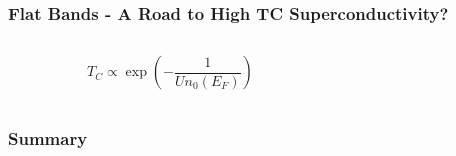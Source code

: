 \documentclass[aspectratio=169]{beamer}
\title{}
\author{Tjark Sievers}
\date{}
\institute[I. ITP - Nonequilibrium Quantum Dynamics]{I. Institute of Theoretical Physics}
\begin{document}
{
\begin{frame}
	\titlepage
\end{frame}
}
\addtocounter{framenumber}{-1}

\begin{frame}
	\frametitle{Flat Bands - A Road to High TC Superconductivity?}
	
	\begin{columns}
		\begin{column}{0.4\textwidth}
			\begin{equation}
				T_C \propto \exp{(- \frac{1}{U n_0 (E_F)})}
			\end{equation}
			\end{column}
			\begin{column}{0.6\textwidth}
			\end{column}
	\end{columns}
\end{frame}

\begin{frame}
	\frametitle{Summary}

\end{frame}
\end{document}
